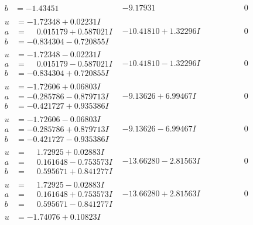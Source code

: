 \documentclass[1p]{elsarticle_modified}
\theoremstyle{definition}
\begin{document}
$$\begin{array}{c|c|c}
\begin{aligned}
b &= -1.43451\phantom{ +0.000000I}\end{aligned}
 & -9.17931\phantom{ +0.000000I} & \phantom{-0.000000 } 0 \\ \hline\begin{aligned}
u &= -1.72348 + 0.02231 I \\
a &= \phantom{-}0.015179 + 0.587021 I \\
b &= -0.834304 - 0.720855 I\end{aligned}
 & -10.41810 + 1.32296 I & \phantom{-0.000000 } 0 \\ \hline\begin{aligned}
u &= -1.72348 - 0.02231 I \\
a &= \phantom{-}0.015179 - 0.587021 I \\
b &= -0.834304 + 0.720855 I\end{aligned}
 & -10.41810 - 1.32296 I & \phantom{-0.000000 } 0 \\ \hline\begin{aligned}
u &= -1.72606 + 0.06803 I \\
a &= -0.285786 - 0.879713 I \\
b &= -0.421727 + 0.935386 I\end{aligned}
 & -9.13626 + 6.99467 I & \phantom{-0.000000 } 0 \\ \hline\begin{aligned}
u &= -1.72606 - 0.06803 I \\
a &= -0.285786 + 0.879713 I \\
b &= -0.421727 - 0.935386 I\end{aligned}
 & -9.13626 - 6.99467 I & \phantom{-0.000000 } 0 \\ \hline\begin{aligned}
u &= \phantom{-}1.72925 + 0.02883 I \\
a &= \phantom{-}0.161648 - 0.753573 I \\
b &= \phantom{-}0.595671 + 0.841277 I\end{aligned}
 & -13.66280 - 2.81563 I & \phantom{-0.000000 } 0 \\ \hline\begin{aligned}
u &= \phantom{-}1.72925 - 0.02883 I \\
a &= \phantom{-}0.161648 + 0.753573 I \\
b &= \phantom{-}0.595671 - 0.841277 I\end{aligned}
 & -13.66280 + 2.81563 I & \phantom{-0.000000 } 0 \\ \hline\begin{aligned}
u &= -1.74076 + 0.10823 I \\

\end{aligned}
\end{array}$$
\end{document}
